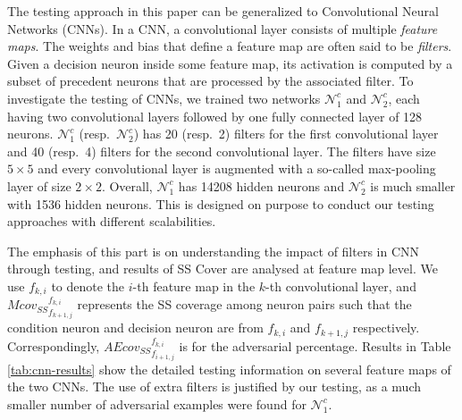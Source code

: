 \documentclass[runningheads,a4paper]{llncs}
\newcommand{\networks}{\mathcal{N}}
\begin{document}
The testing approach in this paper can be generalized to Convolutional
Neural Networks (CNNs).  In a CNN, a convolutional layer consists of
multiple \emph{feature maps}.  The weights and bias that define a feature
map are often said to be \emph{filters}.  Given a decision neuron inside
some feature map, its activation is computed by a subset of precedent
neurons that are processed by the associated filter.  To investigate the
testing of CNNs, we trained two networks $\networks^c_1$ and
$\networks^c_2$, each having two convolutional layers followed by one fully
connected layer of 128 neurons.  $\networks^c_1$ (resp.~$\networks^c_2$) has
20 (resp.~2) filters for the first convolutional layer and 40 (resp.~4)
filters for the second convolutional layer.  The filters have size $5\times
5$ and every convolutional layer is augmented with a so-called max-pooling
layer of size $2\times 2$.  Overall, $\networks^c_1$ has 14208 hidden
neurons and $\networks^c_2$ is much smaller with 1536 hidden neurons.  This
is designed on purpose to conduct our testing approaches with different
scalabilities.

The emphasis of this part is on understanding the impact of filters in CNN
through testing, and results of SS Cover are analysed at feature map level. 
We use $f_{k,i}$ to denote the $i$-th feature map in the $k$-th
convolutional layer, and $M{cov_{SS}}^{f_{k,i}}_{f_{k+1,j}}$ represents the
SS coverage among neuron pairs such that the condition neuron and decision
neuron are from $f_{k,i}$ and $f_{k+1,j}$ respectively.  Correspondingly,
$AE{cov_{SS}}^{f_{k,i}}_{f_{i+1,j}}$ is for the adversarial percentage. 
Results in Table \ref{tab:cnn-results} show the detailed testing information
on several feature maps of the two CNNs.  The use of extra filters is
justified by our testing, as a much smaller number of adversarial examples
were found for $\networks^c_1$.
\end{document}
